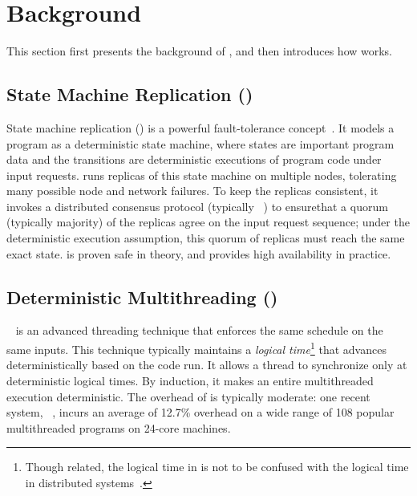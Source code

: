 \section{Background} \label{sec:background}

This section first presents the background of \smr, and then introduces how 
\dmt works.

\subsection{State Machine Replication (\smr)} \label{sec:smr}

State machine replication (\smr) is a powerful fault-tolerance
concept~\cite{paxos:practical}.  It models a program as a deterministic state 
machine, where states are important program data and the transitions are 
deterministic executions of program code under input requests.  \smr runs 
replicas of this state machine on multiple nodes, tolerating many possible node 
and network failures.  To keep the replicas consistent, it invokes a
distributed consensus protocol (typically \paxos~\cite{paxos, paxos:simple, 
paxos:practical}) to ensurethat a quorum (typically majority) of the replicas 
agree on the input request sequence; under the deterministic execution 
assumption, this quorum of replicas must reach the same exact state.  \smr is 
proven safe in theory, and provides high availability in practice.

\subsection{Deterministic Multithreading (\dmt)} \label{sec:dmt}

\dmt~\cite{dpj:oopsla09, 
dmp:asplos09, kendo:asplos09, coredet:asplos10, dos:osdi10, ddos:asplos13, 
ics:oopsla13} is an advanced threading technique that enforces the same 
schedule 
on the same inputs.  This technique typically maintains a \emph{logical
  time}\footnote{Though related, the logical time in \dmt is not to be
  confused with the logical time in distributed
  systems~\cite{lamportclock}.} that advances deterministically based on
the code run.  It allows a thread to synchronize only at deterministic
logical times.  By induction, it makes an entire multithreaded execution
deterministic.  The overhead of \dmt is typically moderate: one recent
\dmt system, \parrot~\cite{parrot:sosp13}, incurs an average of 12.7\%
overhead on a wide range of 108 popular multithreaded programs on 24-core
machines.

